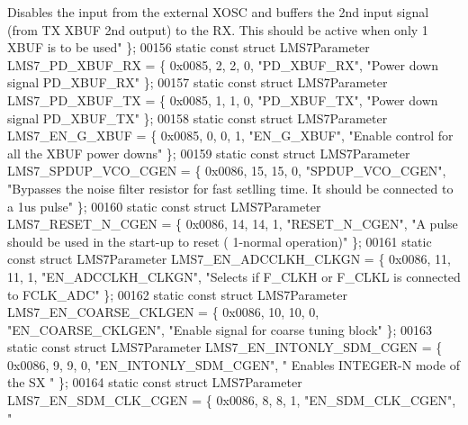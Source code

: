 \begin{DoxyCode}
{      Disables the input from the external XOSC and buffers the 2nd input signal (from TX XBUF 2nd output) to the RX.
       This should be active when only 1 XBUF is to be used"} \};
00156 \textcolor{keyword}{static} \textcolor{keyword}{const} \textcolor{keyword}{struct }LMS7Parameter LMS7_PD_XBUF_RX = \{ 0x0085, 2, 2, 0, \textcolor{stringliteral}{"PD\_XBUF\_RX"}, \textcolor{stringliteral}{"Power down signal
       PD\_XBUF\_RX"} \};
00157 \textcolor{keyword}{static} \textcolor{keyword}{const} \textcolor{keyword}{struct }LMS7Parameter LMS7_PD_XBUF_TX = \{ 0x0085, 1, 1, 0, \textcolor{stringliteral}{"PD\_XBUF\_TX"}, \textcolor{stringliteral}{"Power down signal
       PD\_XBUF\_TX"} \};
00158 \textcolor{keyword}{static} \textcolor{keyword}{const} \textcolor{keyword}{struct }LMS7Parameter LMS7_EN_G_XBUF = \{ 0x0085, 0, 0, 1, \textcolor{stringliteral}{"EN\_G\_XBUF"}, \textcolor{stringliteral}{"Enable control for all
       the XBUF power downs"} \};
00159 \textcolor{keyword}{static} \textcolor{keyword}{const} \textcolor{keyword}{struct }LMS7Parameter LMS7_SPDUP_VCO_CGEN = \{ 0x0086, 15, 15, 0, \textcolor{stringliteral}{"SPDUP\_VCO\_CGEN"}, \textcolor{stringliteral}{"Bypasses
       the noise filter resistor for fast setlling time. It should be connected to a 1us pulse"} \};
00160 \textcolor{keyword}{static} \textcolor{keyword}{const} \textcolor{keyword}{struct }LMS7Parameter LMS7_RESET_N_CGEN = \{ 0x0086, 14, 14, 1, \textcolor{stringliteral}{"RESET\_N\_CGEN"}, \textcolor{stringliteral}{"A pulse should
       be used in the start-up to reset ( 1-normal operation)"} \};
00161 \textcolor{keyword}{static} \textcolor{keyword}{const} \textcolor{keyword}{struct }LMS7Parameter LMS7_EN_ADCCLKH_CLKGN = \{ 0x0086, 11, 11, 1, \textcolor{stringliteral}{"EN\_ADCCLKH\_CLKGN"}, \textcolor{stringliteral}{"Selects
       if F\_CLKH or F\_CLKL is connected to FCLK\_ADC"} \};
00162 \textcolor{keyword}{static} \textcolor{keyword}{const} \textcolor{keyword}{struct }LMS7Parameter LMS7_EN_COARSE_CKLGEN = \{ 0x0086, 10, 10, 0, \textcolor{stringliteral}{"EN\_COARSE\_CKLGEN"}, \textcolor{stringliteral}{"Enable
       signal for coarse tuning block"} \};
00163 \textcolor{keyword}{static} \textcolor{keyword}{const} \textcolor{keyword}{struct }LMS7Parameter LMS7_EN_INTONLY_SDM_CGEN = \{ 0x0086, 9, 9, 0, \textcolor{stringliteral}{"EN\_INTONLY\_SDM\_CGEN"}, \textcolor{stringliteral}{"
      Enables INTEGER-N mode of the SX "} \};
00164 \textcolor{keyword}{static} \textcolor{keyword}{const} \textcolor{keyword}{struct }LMS7Parameter LMS7_EN_SDM_CLK_CGEN = \{ 0x0086, 8, 8, 1, \textcolor{stringliteral}{"EN\_SDM\_CLK\_CGEN"}, \textcolor{stringliteral}{"
}
\end{DoxyCode}
